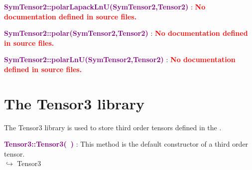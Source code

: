 
\textcolor{purple}{\textbf{SymTensor2::polarLapackLnU(SymTensor2,Tensor2)}}\label{SymTensor2::polarLapackLnU(SymTensor2,Tensor2)} : \textcolor{red}{\textbf{No documentation defined in source files.}}


\textcolor{purple}{\textbf{SymTensor2::polar(SymTensor2,Tensor2)}}\label{SymTensor2::polar(SymTensor2,Tensor2)} : \textcolor{red}{\textbf{No documentation defined in source files.}}


\textcolor{purple}{\textbf{SymTensor2::polarLnU(SymTensor2,Tensor2)}}\label{SymTensor2::polarLnU(SymTensor2,Tensor2)} : \textcolor{red}{\textbf{No documentation defined in source files.}}


\section{The Tensor3 library}

The Tensor3 library is used to store third order tensors defined in the \DynELA.

\textcolor{purple}{\textbf{Tensor3::Tensor3(~)}}\label{Tensor3::Tensor3()} : This method is the default constructor of a third order tensor.\\ \hspace*{5mm}$\hookrightarrow$ Tensor3

